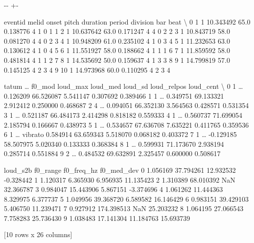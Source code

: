 \documentclass[letterpaper,10pt,english]{sphinxmanual}
\newlength\nbsphinxcodecellspacing
\begin{document}
{

\kern-\sphinxverbatimsmallskipamount\kern-\baselineskip
\kern+\FrameHeightAdjust\kern-\fboxrule
\vspace{\nbsphinxcodecellspacing}

\begin{sphinxVerbatim}[commandchars=\\\{\}]
\llap{\color{nbsphinxout}[8]:\,\hspace{\fboxrule}\hspace{\fboxsep}}   eventid  melid      onset  pitch  duration  period  division  bar  beat  \textbackslash{}
0        1      1  10.343492   65.0  0.138776       4         1    0     1
1        2      1  10.637642   63.0  0.171247       4         4    0     2
2        3      1  10.843719   58.0  0.081270       4         4    0     2
3        4      1  10.948209   61.0  0.235102       4         1    0     3
4        5      1  11.232653   63.0  0.130612       4         1    0     4
5        6      1  11.551927   58.0  0.188662       4         1    1     1
6        7      1  11.859592   58.0  0.481814       4         1    1     2
7        8      1  14.535692   50.0  0.159637       4         1    3     3
8        9      1  14.799819   57.0  0.145125       4         2    3     4
9       10      1  14.973968   60.0  0.110295       4         2    3     4

   tatum  {\ldots}   f0\_mod  loud\_max   loud\_med   loud\_sd  loud\_relpos loud\_cent  \textbackslash{}
0      1  {\ldots}           0.126209  66.526087  5.541147     0.307692  0.389466
1      1  {\ldots}           0.349751  69.133321  2.912412     0.250000  0.468687
2      4  {\ldots}           0.094051  66.352130  3.564563     0.428571  0.531354
3      1  {\ldots}           0.521187  66.484173  2.414298     0.818182  0.559333
4      1  {\ldots}           0.560737  71.699054  2.185794     0.166667  0.438973
5      1  {\ldots}           0.534657  67.636708  7.635221     0.411765  0.359536
6      1  {\ldots}  vibrato  0.584914  63.659343  5.518070     0.068182  0.403372
7      1  {\ldots}          -0.129185  58.507975  5.020340     0.133333  0.368384
8      1  {\ldots}           0.599931  71.173670  2.938194     0.285714  0.551884
9      2  {\ldots}           0.484532  69.632891  2.325457     0.600000  0.508617

   loud\_s2b    f0\_range  f0\_freq\_hz  f0\_med\_dev
0  1.056169   37.794261   12.932532   -0.328442
1  1.120317    6.365930    6.956935   11.135423
2  1.310389   68.010392         NaN   32.366787
3  0.984047   15.443906    5.867151   -3.374696
4  1.061262   11.444363    8.329975    6.377737
5  1.049956   39.368720    6.589582   16.146429
6  0.983151   39.429103    5.406750   11.239471
7  0.927912  174.398513         NaN   25.203232
8  1.064195   27.066543    7.758283   25.736430
9  1.038483   17.141304   11.184763   15.693739

[10 rows x 26 columns]
\end{sphinxVerbatim}
}
\end{document}
